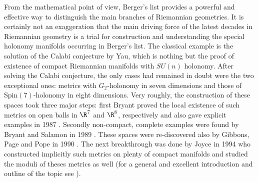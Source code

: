 \documentclass[a4paper,12pt,draft]{article}
\begin{document}
From the mathematical point of view,
Berger's list provides a powerful and effective way to distinguish 
the main branches of Riemannian geometries. It is certainly not
an exaggeration that the main driving force of the latest decades in
Riemannian geometry is a trial for construction and understanding the
special holonomy manifolds occurring in Berger's list. The classical
example is the solution of the Calabi conjecture by Yau, which is nothing
but the proof of existence of compact Riemannian manifolds with $SU(n)$
holonomy. After solving the Calabi conjecture, the only cases had remained
in doubt were the two exceptional ones: metrics with $G_2$-holonomy in
seven dimensions and those of Spin$(7)$-holonomy in eight
dimensions. Very roughly, the
construction of these spaces took three major steps: first Bryant proved
the local existence of such metrics on open balls in $\R^7$ and $\R^8$,
respectively and also gave explicit examples in 1987 \cite{bry}. Secondly
non-compact, complete examples were found by Bryant and Salamon in
1989 \cite{bry-sal}. These spaces were re-discovered also by Gibbons,
Page and Pope in 1990 \cite{gib-pag-pop}. The next breakthrough was done
by Joyce in 1994 who constructed implicitly such metrics on plenty 
of compact manifolds and studied the moduli of theses metrics as well (for
a general and excellent introduction and outline of the topic see
\cite{joy}). 
\end{document}
